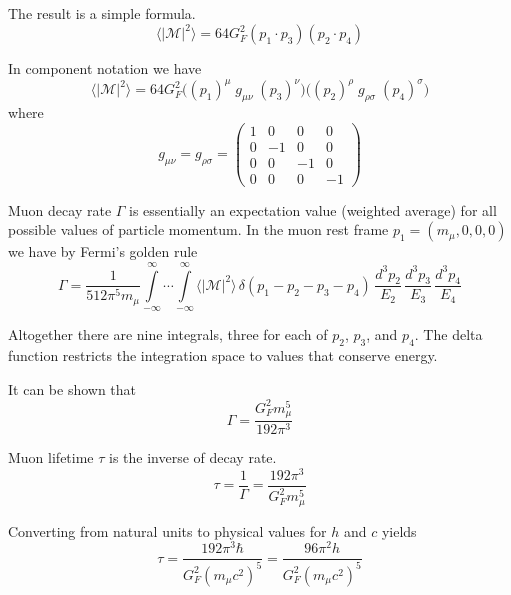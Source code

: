 \documentclass[12pt]{article}
\begin{document}
\noindent
The result is a simple formula.
\begin{equation*}
\langle|\mathcal{M}|^2\rangle=64G_F^2(p_1\cdot p_3)(p_2\cdot p_4)
\tag{1}
\end{equation*}

\noindent
In component notation we have
\begin{equation*}
\langle|\mathcal{M}|^2\rangle=64G_F^2
\bigg((p_1)^\mu \; g_{\mu\nu}\; (p_3)^\nu\bigg)
\bigg((p_2)^\rho \; g_{\rho\sigma} \; (p_4)^\sigma\bigg)
\end{equation*}
where
\begin{equation*}
g_{\mu\nu}=g_{\rho\sigma}=\begin{pmatrix}
1 & 0 & 0 & 0\\
0 & -1 & 0 & 0\\
0 & 0 & -1 & 0\\
0 & 0 & 0 & -1
\end{pmatrix}
\end{equation*}

\noindent
Muon decay rate $\Gamma$ is essentially an expectation value (weighted average)
for all possible values of particle momentum.
In the muon rest frame $p_1=(m_\mu,0,0,0)$ we have by Fermi's golden rule
\begin{equation*}
\Gamma=\frac{1}{512\pi^5m_\mu}
\int\limits_{-\infty}^\infty \cdots \int\limits_{-\infty}^\infty
\langle|\mathcal{M}|^2\rangle
\,\delta(p_1-p_2-p_3-p_4)
\,\frac{d^3p_2}{E_2}\,\frac{d^3p_3}{E_3}\,\frac{d^3p_4}{E_4}
\end{equation*}

\noindent
Altogether there are nine integrals, three for each of $p_2$, $p_3$, and $p_4$.
The delta function restricts the integration space to values that conserve energy.

\bigskip
\noindent
It can be shown that
\begin{equation*}
\Gamma=\frac{G_F^2 m_\mu^5}{192\pi^3}
\end{equation*}

\noindent
Muon lifetime $\tau$ is the inverse of decay rate.
\begin{equation*}
\tau=\frac{1}{\Gamma}=\frac{192\pi^3}{G_F^2 m_\mu^5}
\end{equation*}

\noindent
Converting from natural units to physical values for $h$ and $c$ yields
\begin{equation*}
\tau
=\frac{192\pi^3\hbar}{G_F^2\left(m_\mu c^2\right)^5}
=\frac{96\pi^2h}{G_F^2\left(m_\mu c^2\right)^5}
\end{equation*}
\end{document}
